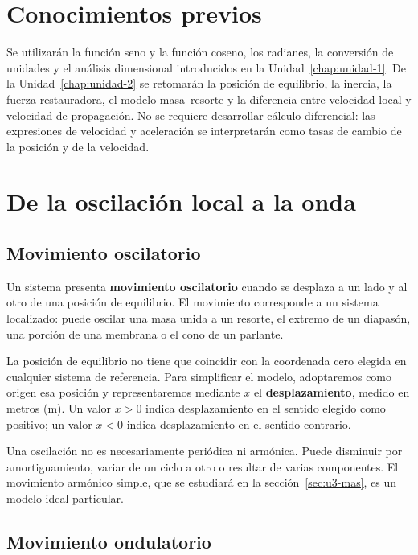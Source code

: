 \section{Conocimientos previos}
\label{sec:u3-previos}

Se utilizarán la función seno y la función coseno, los radianes, la conversión
de unidades y el análisis dimensional introducidos en la
Unidad~\ref{chap:unidad-1}. De la Unidad~\ref{chap:unidad-2} se retomarán la
posición de equilibrio, la inercia, la fuerza restauradora, el modelo
masa--resorte y la diferencia entre velocidad local y velocidad de
propagación. No se requiere desarrollar cálculo diferencial: las expresiones
de velocidad y aceleración se interpretarán como tasas de cambio de la
posición y de la velocidad.

\section{De la oscilación local a la onda}
\label{sec:u3-oscilacion-onda}

\subsection{Movimiento oscilatorio}
\label{sec:u3-movimiento-oscilatorio}

Un sistema presenta \textbf{movimiento oscilatorio} cuando se desplaza a un
lado y al otro de una posición de equilibrio. El movimiento corresponde a un
sistema localizado: puede oscilar una masa unida a un resorte, el extremo de
un diapasón, una porción de una membrana o el cono de un parlante.

La posición de equilibrio no tiene que coincidir con la coordenada cero
elegida en cualquier sistema de referencia. Para simplificar el modelo,
adoptaremos como origen esa posición y representaremos mediante \(x\) el
\textbf{desplazamiento}, medido en metros (\(\text{m}\)). Un valor \(x>0\)
indica desplazamiento en el sentido elegido como positivo; un valor \(x<0\)
indica desplazamiento en el sentido contrario.

Una oscilación no es necesariamente periódica ni armónica. Puede disminuir por
amortiguamiento, variar de un ciclo a otro o resultar de varias componentes.
El movimiento armónico simple, que se estudiará en la
sección~\ref{sec:u3-mas}, es un modelo ideal particular.

\subsection{Movimiento ondulatorio}
\label{sec:u3-movimiento-ondulatorio}

